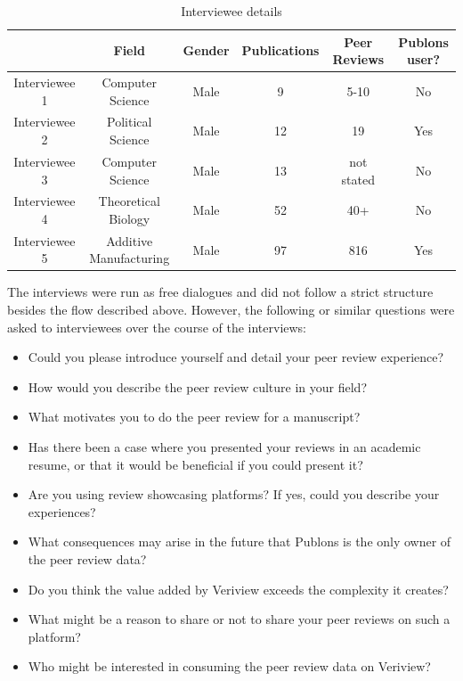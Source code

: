 \begin{table}[]
    \centering
    \begin{tabular}{c|c|c|c|c|c}
         & Field & Gender & Publications & Peer Reviews & Publons user? \\
         \hline
         Interviewee 1 & Computer Science & Male & 9 & 5-10 & No \\
         Interviewee 2 & Political Science & Male & 12 & 19 & Yes \\
         Interviewee 3 & Computer Science & Male & 13 & not stated & No \\
         Interviewee 4 & Theoretical Biology & Male & 52 & 40+ & No \\
         Interviewee 5 & Additive Manufacturing & Male & 97 & 816 & Yes \\
    \end{tabular}
    \caption{Interviewee details}
    \label{tab:interviewees}
\end{table}

The interviews were run as free dialogues and did not follow a strict structure besides the flow described above. However, the following or similar questions were asked to interviewees over the course of the interviews:

\begin{itemize}
    \item Could you please introduce yourself and detail your peer review experience?
    \item How would you describe the peer review culture in your field?
    \item What motivates you to do the peer review for a manuscript?
    \item Has there been a case where you presented your reviews in an academic resume, or that it would be beneficial if you could present it?
    \item Are you using review showcasing platforms? If yes, could you describe your experiences?
    \item What consequences may arise in the future that Publons is the only owner of the peer review data?
    \item Do you think the value added by Veriview exceeds the complexity it creates?
    \item What might be a reason to share or not to share your peer reviews on such a platform?
    \item Who might be interested in consuming the peer review data on Veriview?
\end{itemize}

